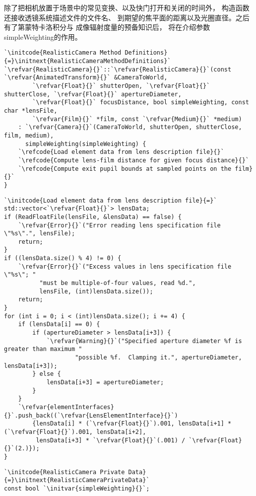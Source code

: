 除了把相机放置于场景中的常见变换、以及快门打开和关闭的时间外，
构造函数还接收透镜系统描述文件的文件名、
到期望的焦平面的距离以及光圈直径。之后有了第蒙特卡洛积分与
成像辐射度量的预备知识后，
将在介绍参数{\ttfamily simpleWeighting}的作用。
\begin{lstlisting}
`\initcode{RealisticCamera Method Definitions}{=}\initnext{RealisticCameraMethodDefinitions}`
`\refvar{RealisticCamera}{}`::`\refvar{RealisticCamera}{}`(const `\refvar{AnimatedTransform}{}` &CameraToWorld,
        `\refvar{Float}{}` shutterOpen, `\refvar{Float}{}` shutterClose, `\refvar{Float}{}` apertureDiameter,
        `\refvar{Float}{}` focusDistance, bool simpleWeighting, const char *lensFile,
        `\refvar{Film}{}` *film, const `\refvar{Medium}{}` *medium)
    : `\refvar{Camera}{}`(CameraToWorld, shutterOpen, shutterClose, film, medium),
      simpleWeighting(simpleWeighting) {
    `\refcode{Load element data from lens description file}{}`
    `\refcode{Compute lens-film distance for given focus distance}{}`
    `\refcode{Compute exit pupil bounds at sampled points on the film}{}`
}
\end{lstlisting}
\begin{lstlisting}
`\initcode{Load element data from lens description file}{=}`
std::vector<`\refvar{Float}{}`> lensData;
if (ReadFloatFile(lensFile, &lensData) == false) {
    `\refvar{Error}{}`("Error reading lens specification file \"%s\".", lensFile);
    return;
}
if ((lensData.size() % 4) != 0) {
    `\refvar{Error}{}`("Excess values in lens specification file \"%s\"; "
          "must be multiple-of-four values, read %d.",
          lensFile, (int)lensData.size());
    return;
}
for (int i = 0; i < (int)lensData.size(); i += 4) {
    if (lensData[i] == 0) {
        if (apertureDiameter > lensData[i+3]) {
            `\refvar{Warning}{}`("Specified aperture diameter %f is greater than maximum "
                    "possible %f.  Clamping it.", apertureDiameter, lensData[i+3]);
        } else {
            lensData[i+3] = apertureDiameter;
        }
    }
    `\refvar{elementInterfaces}{}`.push_back((`\refvar{LensElementInterface}{}`)
        {lensData[i] * (`\refvar{Float}{}`).001, lensData[i+1] * (`\refvar{Float}{}`).001, lensData[i+2],
         lensData[i+3] * `\refvar{Float}{}`(.001) / `\refvar{Float}{}`(2.)});
}
\end{lstlisting}
\begin{lstlisting}
`\initcode{RealisticCamera Private Data}{=}\initnext{RealisticCameraPrivateData}`
const bool `\initvar{simpleWeighting}{}`;
\end{lstlisting}


